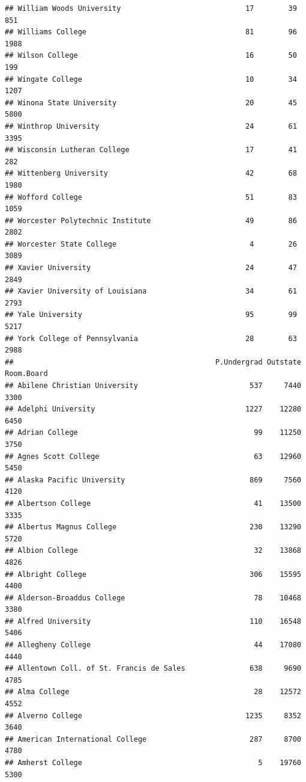 \documentclass[
]{article}
\begin{document}
\begin{verbatim}
## William Woods University                             17        39         851
## Williams College                                     81        96        1988
## Wilson College                                       16        50         199
## Wingate College                                      10        34        1207
## Winona State University                              20        45        5800
## Winthrop University                                  24        61        3395
## Wisconsin Lutheran College                           17        41         282
## Wittenberg University                                42        68        1980
## Wofford College                                      51        83        1059
## Worcester Polytechnic Institute                      49        86        2802
## Worcester State College                               4        26        3089
## Xavier University                                    24        47        2849
## Xavier University of Louisiana                       34        61        2793
## Yale University                                      95        99        5217
## York College of Pennsylvania                         28        63        2988
##                                               P.Undergrad Outstate Room.Board
## Abilene Christian University                          537     7440       3300
## Adelphi University                                   1227    12280       6450
## Adrian College                                         99    11250       3750
## Agnes Scott College                                    63    12960       5450
## Alaska Pacific University                             869     7560       4120
## Albertson College                                      41    13500       3335
## Albertus Magnus College                               230    13290       5720
## Albion College                                         32    13868       4826
## Albright College                                      306    15595       4400
## Alderson-Broaddus College                              78    10468       3380
## Alfred University                                     110    16548       5406
## Allegheny College                                      44    17080       4440
## Allentown Coll. of St. Francis de Sales               638     9690       4785
## Alma College                                           28    12572       4552
## Alverno College                                      1235     8352       3640
## American International College                        287     8700       4780
## Amherst College                                         5    19760       5300

\end{verbatim}
\end{document}
